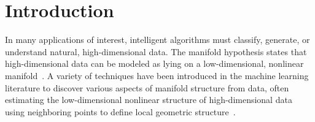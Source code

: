 \documentclass[letterpaper]{article} %
\begin{document}
\section{Introduction}
In many applications of interest, intelligent algorithms must classify, generate, or understand natural, high-dimensional data. The manifold hypothesis states that high-dimensional data can be modeled as lying on a low-dimensional, nonlinear manifold~\cite{fefferman2016testing}. A variety of techniques have been introduced in the machine learning literature to discover various aspects of manifold structure from data, often estimating the low-dimensional nonlinear structure of high-dimensional data using neighboring points to define local geometric structure~\cite{tenenbaum2000global,roweis2000nonlinear,dollar2007learning,bengio2005non,rao1999learning,miao2007learning,culpepper2009learning}. 
\end{document}
